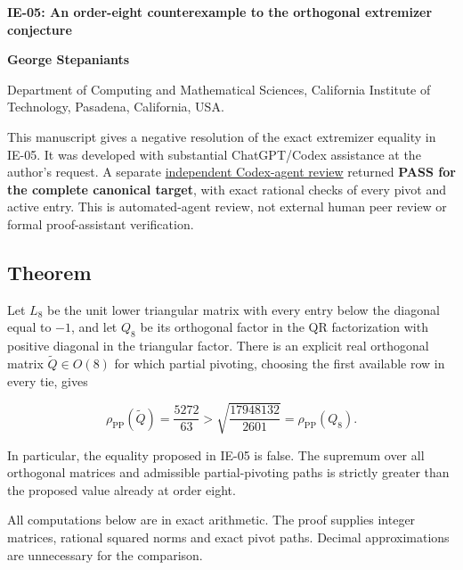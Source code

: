 \documentclass[10pt,a4paper]{article}
\begin{document}
{\raggedright\Large\bfseries IE-05: An order-eight counterexample to the
orthogonal extremizer conjecture\par}
\vspace{0.4em}
{\normalsize\bfseries George Stepaniants\par}
{\small Department of Computing and Mathematical Sciences, California
Institute of Technology, Pasadena, California, USA.\par}
\vspace{0.6em}
\pagestyle{plain}
\setlength{\abovedisplayskip}{6pt}
\setlength{\belowdisplayskip}{6pt}
\setlength{\abovedisplayshortskip}{4pt}
\setlength{\belowdisplayshortskip}{4pt}

This manuscript gives a negative resolution of the exact extremizer
equality in IE-05. It was developed with substantial ChatGPT/Codex
assistance at the author's request. A separate
\href{https://github.com/ajt60gaibb/OpenProblemsInNLA/blob/main/references/stepaniants-ie05-2026-09-11/independent-review.md}{independent
Codex-agent review} returned \textbf{PASS for the complete canonical
target}, with exact rational checks of every pivot and active entry.
This is automated-agent review, not external human peer review or formal
proof-assistant verification.

\subsection{Theorem}\label{theorem}

Let \(L_8\) be the unit lower triangular matrix with every entry below
the diagonal equal to \(-1\), and let \(Q_8\) be its orthogonal factor
in the QR factorization with positive diagonal in the triangular factor.
There is an explicit real orthogonal matrix \(\widetilde Q\in O(8)\) for
which partial pivoting, choosing the first available row in every tie,
gives

\nopagebreak[4]

\[
\rho_{\mathrm{PP}}(\widetilde Q)=\frac{5272}{63}
>\sqrt{\frac{17948132}{2601}}
=\rho_{\mathrm{PP}}(Q_8).
\]

In particular, the equality proposed in IE-05 is false. The supremum
over all orthogonal matrices and admissible partial-pivoting paths is
strictly greater than the proposed value already at order eight.

All computations below are in exact arithmetic. The proof supplies
integer matrices, rational squared norms and exact pivot paths. Decimal
approximations are unnecessary for the comparison.
\end{document}
